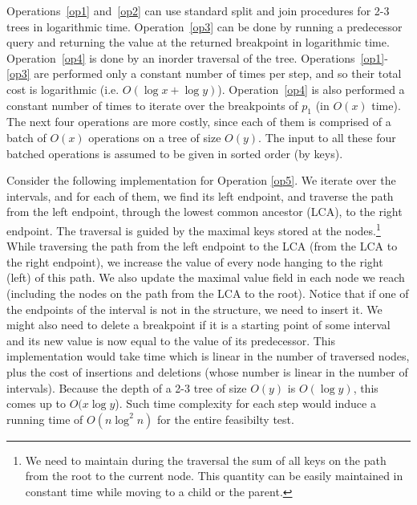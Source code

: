 \documentclass[a4paper,UKenglish]{lipics-v2016}
\theoremstyle{plain}
\begin{document}
 Operations~\ref{op1} and~\ref{op2} can use standard split and join procedures for 2-3 trees in logarithmic time. 
 Operation~\ref{op3} can be done by running a predecessor query and returning the value at the returned breakpoint in logarithmic time.
 Operation~\ref{op4} is done by an inorder traversal of the tree. 
Operations~\ref{op1}-\ref{op3} are performed only a constant number of times per step, and so their total cost is logarithmic (i.e. $O(\log x + \log y)$). Operation~\ref{op4} is also performed a constant number of times to iterate over the breakpoints of $p_{1}$ (in $O(x)$ time). The next four operations are more costly, since each of them is comprised of a batch of $O(x)$ operations on a tree of size $O(y)$. The input to all these four batched operations is assumed to be given in sorted order (by keys).


\medskip {}
Consider the following implementation for Operation \ref{op5}. We iterate over the intervals, and for each of them, we find its left endpoint, and traverse the path from the left endpoint, through the lowest common ancestor (LCA), to the right endpoint.
The traversal is guided by the maximal keys stored at the nodes.\footnote{We need to maintain during the traversal the sum of all keys on the path from the root to the current node. This quantity can be easily maintained in constant time while moving to a child or the parent.}
While traversing the path from the left endpoint to the LCA (from the LCA to the right endpoint), we increase the value of every node hanging to the right (left) of this path. We also update the maximal value field in each node we reach (including the nodes on the path from the LCA to the root). Notice that if one of the endpoints of the interval is not in the structure, we need to insert it. We might also need to delete a breakpoint if it is a starting point of some interval and its new value is now equal to the value of its predecessor. This implementation would take time which is linear in the number of traversed nodes, plus the cost of insertions and deletions (whose number is linear in the number of intervals). Because the depth of a 2-3 tree of size $O(y)$ is $O(\log y)$, this comes up to $O(x \log y$). Such time complexity for each step would induce a running time of $O(n \log ^2 n)$ for the entire feasibilty test. 
\end{document}
